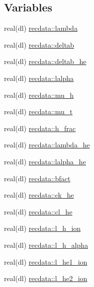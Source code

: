 \subsection*{Variables}
\begin{DoxyCompactItemize}
\item 
real(dl) \mbox{\hyperlink{namespacerecdata_a2c475bdeb3e0999a1360325ceae144c2}{recdata\+::lambda}}
\item 
real(dl) \mbox{\hyperlink{namespacerecdata_a5430ac96b61e841e793860353de75b94}{recdata\+::deltab}}
\item 
real(dl) \mbox{\hyperlink{namespacerecdata_ac9a28ec71046fead8431567d914339e5}{recdata\+::deltab\+\_\+he}}
\item 
real(dl) \mbox{\hyperlink{namespacerecdata_af77171b4139af45b976e7388f08ad74a}{recdata\+::lalpha}}
\item 
real(dl) \mbox{\hyperlink{namespacerecdata_af00c668a1086ccf9c6fb815e45e5c9dd}{recdata\+::mu\+\_\+h}}
\item 
real(dl) \mbox{\hyperlink{namespacerecdata_afca9c6c4a945b5d2b59ca00f446f869a}{recdata\+::mu\+\_\+t}}
\item 
real(dl) \mbox{\hyperlink{namespacerecdata_ae9965fc6c0b6f37a85b51427e8155eb3}{recdata\+::h\+\_\+frac}}
\item 
real(dl) \mbox{\hyperlink{namespacerecdata_a2eac004fa1bc20ce7480574fc7e7f8ec}{recdata\+::lambda\+\_\+he}}
\item 
real(dl) \mbox{\hyperlink{namespacerecdata_aef43ee94c4fd432972ea10fe6e93f8bb}{recdata\+::lalpha\+\_\+he}}
\item 
real(dl) \mbox{\hyperlink{namespacerecdata_a98e25aebe5900dc1cca84fe8be016dc4}{recdata\+::bfact}}
\item 
real(dl) \mbox{\hyperlink{namespacerecdata_a13fa08cdf3070bc28dbc41bac31f8992}{recdata\+::ck\+\_\+he}}
\item 
real(dl) \mbox{\hyperlink{namespacerecdata_ae811f636720451c3155e017e57bb09cf}{recdata\+::cl\+\_\+he}}
\item 
real(dl) \mbox{\hyperlink{namespacerecdata_ae841ee816424d8ed36613769eac72b75}{recdata\+::l\+\_\+h\+\_\+ion}}
\item 
real(dl) \mbox{\hyperlink{namespacerecdata_adb25613b2cf535a5250d0040b5da8e8e}{recdata\+::l\+\_\+h\+\_\+alpha}}
\item 
real(dl) \mbox{\hyperlink{namespacerecdata_a88ef0c92d1cad9570136fa55d1899af0}{recdata\+::l\+\_\+he1\+\_\+ion}}
\item 
real(dl) \mbox{\hyperlink{namespacerecdata_a09a8999d2bef3fe3af6c0216cb534b5d}{recdata\+::l\+\_\+he2\+\_\+ion}}

\end{DoxyCompactItemize}
